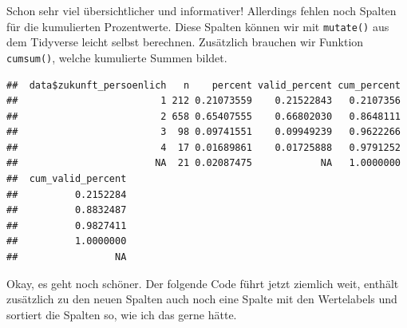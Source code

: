 \documentclass[
]{book}
\newenvironment{Shaded}{\begin{snugshade}}{\end{snugshade}}
\newcommand{\AttributeTok}[1]{\textcolor[rgb]{0.77,0.63,0.00}{#1}}
\newcommand{\CommentTok}[1]{\textcolor[rgb]{0.56,0.35,0.01}{\textit{#1}}}
\newcommand{\FunctionTok}[1]{\textcolor[rgb]{0.00,0.00,0.00}{#1}}
\newcommand{\NormalTok}[1]{#1}
\newcommand{\SpecialCharTok}[1]{\textcolor[rgb]{0.00,0.00,0.00}{#1}}
\begin{document}
Schon sehr viel übersichtlicher und informativer! Allerdings fehlen noch Spalten für die kumulierten Prozentwerte. Diese Spalten können wir mit \texttt{mutate()} aus dem Tidyverse leicht selbst berechnen. Zusätzlich brauchen wir Funktion \texttt{cumsum()}, welche kumulierte Summen bildet.

\begin{Shaded}
\end{Shaded}

\begin{verbatim}
##  data$zukunft_persoenlich   n    percent valid_percent cum_percent
##                         1 212 0.21073559    0.21522843   0.2107356
##                         2 658 0.65407555    0.66802030   0.8648111
##                         3  98 0.09741551    0.09949239   0.9622266
##                         4  17 0.01689861    0.01725888   0.9791252
##                        NA  21 0.02087475            NA   1.0000000
##  cum_valid_percent
##          0.2152284
##          0.8832487
##          0.9827411
##          1.0000000
##                 NA
\end{verbatim}

Okay, es geht noch schöner. Der folgende Code führt jetzt ziemlich weit, enthält zusätzlich zu den neuen Spalten auch noch eine Spalte mit den Wertelabels und sortiert die Spalten so, wie ich das gerne hätte.
\end{document}
